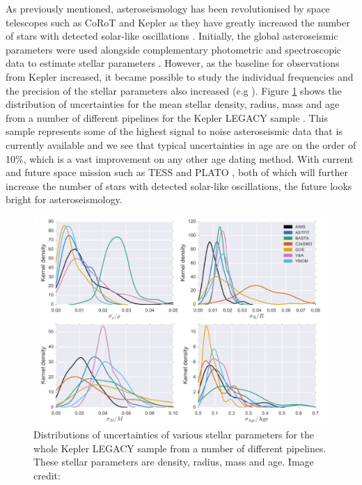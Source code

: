 As previously mentioned, asteroseismology has been revolutionised by space telescopes such as CoRoT and Kepler as they have greatly increased the number of stars with detected solar-like oscillations \citep{Chaplin_etal_2011}. Initially, the global asteroseismic parameters were used alongside complementary photometric and spectroscopic data to estimate stellar parameters \citep{Chaplin_etal_2014}. However, as the baseline for observations from Kepler increased, it became possible to study the individual frequencies and the precision of the stellar parameters also increased (e.g \citealt{Silva_Aguirre_etal_2015}). Figure \ref{fig:VSA_legacy_uncertainties} shows the distribution of uncertainties for the mean stellar density, radius, mass and age from a number of different pipelines for the Kepler LEGACY sample \citep{Lund_etal_2017}. This sample represents some of the highest signal to noise asteroseismic data that is currently available and we see that typical uncertainties in age are on the order of 10\%, which is a vast improvement on any other age dating method. With current and future space mission such as TESS \citep{Ricker_etal_2015} and PLATO \citep{Rauer_etal_2014}, both of which will further increase the number of stars with detected solar-like oscillations, the future looks bright for asteroseismology.

\begin{figure}
    \centering
    \includegraphics[scale=0.4]{Figures/1-Introduction/silva_aguirre_2017_legacy.pdf}
    \caption[Distributions of uncertainties in asteroseismically determined parameters]{Distributions of uncertainties of various stellar parameters for the whole Kepler LEGACY sample from a number of different pipelines. These stellar parameters are density, radius, mass and age. Image credit: \citet{Silva_Aguirre_etal_2017}}
    \label{fig:VSA_legacy_uncertainties}
\end{figure}

